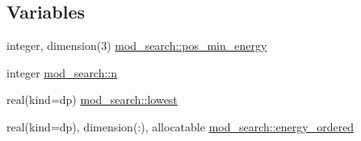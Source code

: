 \subsection*{Variables}
\begin{DoxyCompactItemize}
\item 
integer, dimension(3) \hyperlink{namespacemod__search_a018a3c64ea9e25b0dfc15ebe763920cf}{mod\+\_\+search\+::pos\+\_\+min\+\_\+energy}
\item 
integer \hyperlink{namespacemod__search_a0c7388c12d8e6a95b8c3f9fd86321687}{mod\+\_\+search\+::n}
\item 
real(kind=dp) \hyperlink{namespacemod__search_a014567a8f5474b311cedf2f9b1dbda1a}{mod\+\_\+search\+::lowest}
\item 
real(kind=dp), dimension(\+:), allocatable \hyperlink{namespacemod__search_a8ce72764a5658f7958ed5c473dd77706}{mod\+\_\+search\+::energy\+\_\+ordered}
\end{DoxyCompactItemize}

